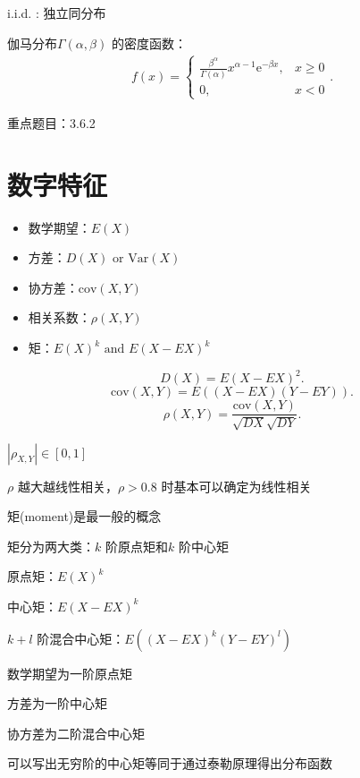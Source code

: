 \begin{notation}
    i.i.d. : 独立同分布
\end{notation}
\begin{notation}
    伽马分布$\varGamma\left( \alpha,\beta \right) $ 的密度函数：
    \begin{align*}
        f\left( x \right) =\begin{cases}
            {\frac{\beta^{\alpha}}{\Gamma\left( \alpha \right) }}x^{\alpha-1}\mathrm{e}^{-\beta x}, &x\ge 0\\
            0,&x<0
        \end{cases}
    .\end{align*}
\end{notation}
\begin{notation}
    重点题目：3.6.2
\end{notation}
\section{数字特征}%
\label{sec:数字特征}
\begin{itemize}
    \item 数学期望：$E\left( X \right)$
    \item 方差：$D\left( X \right) \text{ or }\mathrm{Var}\left( X \right) $
    \item 协方差：$\mathrm{cov}\left( X,Y \right) $
    \item 相关系数：$\rho\left( X,Y \right)$ 
    \item 矩：$E\left( X \right) ^{k} \text{ and } E\left( X-EX \right) ^{k}$    
\end{itemize}
\[
    D\left( X \right) =E\left( X-EX \right) ^2
.\] 
\[
    \text{cov}\left( X,Y \right) =E\left( \left( X-EX \right) \left( Y-EY \right)  \right) 
.\] 
\[
    \rho\left( X,Y \right) ={\frac{\text{cov}\left( X,Y \right) }{\sqrt{DX} \sqrt{DY} }}
.\] 
\begin{notation}
    $|\rho_{X,Y}|\in [0,1]$ 
    
    $\rho$ 越大越线性相关，$\rho>0.8$ 时基本可以确定为线性相关
\end{notation}
\begin{notation}
    矩(moment)是最一般的概念

    矩分为两大类：$k$ 阶原点矩和$k$ 阶中心矩

    原点矩：$E\left( X \right) ^{k}$

    中心矩：$E\left( X-EX \right) ^{k}$

    $k+l$ 阶混合中心矩：$E\left( \left( X-EX \right) ^{k}\left( Y-EY \right) ^{l} \right) $
\end{notation}
\begin{eg}
    数学期望为一阶原点矩

    方差为一阶中心矩

    协方差为二阶混合中心矩
\end{eg}
可以写出无穷阶的中心矩等同于通过泰勒原理得出分布函数

